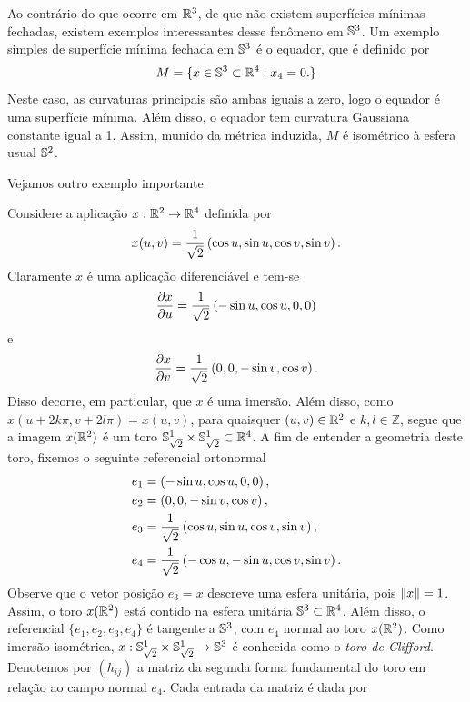 Ao contrário do que ocorre em $\mathbb{R}^3$, de que não existem superfícies mínimas fechadas, existem exemplos interessantes desse fenômeno em $\mathbb{S}^3$. Um exemplo simples de superfície mínima fechada em $\mathbb{S}^3$ é o equador, que é definido por
\[ M = \{ x \in \mathbb{S}^3 \subset \mathbb{R}^4: x_4=0. \} \]
Neste caso, as curvaturas principais são ambas iguais a zero, logo o equador é uma superfície mínima. Além disso, o equador tem curvatura Gaussiana constante igual a 1. Assim, munido da métrica induzida, $M$ é isométrico à esfera usual $\mathbb{S}^2$.

Vejamos outro exemplo importante.

\begin{exemplo}
	Considere a aplicação $x: \mathbb{R}^2 \rightarrow \mathbb{R}^4$ definida por
	\begin{equation}\label{def:toro-de-clifford}
		x(u,v) = \frac{1}{\sqrt{2}} \left( \cos u, \sin u, \cos v, \sin v \right).
	\end{equation}
	Claramente $x$ é uma aplicação diferenciável e tem-se
	\[ \frac{\partial x}{\partial u} = \frac{1}{\sqrt{2}} \left( -\sin u, \cos u, 0, 0 \right) \]
	e
	\[ \frac{\partial x}{\partial v} = \frac{1}{\sqrt{2}} \left( 0,0, -\sin v, \cos v \right). \]
	Disso decorre, em particular, que $x$ é uma imersão. Além disso, como $x(u + 2k \pi, v + 2l \pi) = x(u,v)$, para quaisquer $(u,v) \in \mathbb{R}^2$ e $k,l \in \mathbb{Z}$, segue que a imagem $x(\mathbb{R}^2)$ é um toro $\mathbb{S}_{\sqrt{2}}^1 \times \mathbb{S}_{\sqrt{2}}^1 \subset \mathbb{R}^4$. A fim de entender a geometria deste toro, fixemos o seguinte referencial ortonormal
	\begin{align*}
		e_1 &= \left( -\sin u, \cos u, 0, 0 \right),\\
		e_2 &= \left( 0, 0, -\sin v, \cos v \right),\\
		e_3 &= \frac{1}{\sqrt{2}} \left( \cos u, \sin u, \cos v, \sin v \right),\\
		e_4 &= \frac{1}{\sqrt{2}} \left( -\cos u, -\sin u, \cos v, \sin v \right).
	\end{align*}
	Observe que o vetor posição $e_3 = x$ descreve uma esfera unitária, pois $\left\| x \right\| = 1$. Assim, o toro $x(\mathbb{R}^2)$ está contido na esfera unitária $\mathbb{S}^3 \subset \mathbb{R}^4$. Além disso, o referencial $\{e_1,e_2,e_3,e_4\}$ é tangente a $\mathbb{S}^3$, com
	$e_4$ normal ao toro $x(\mathbb{R}^2)$. Como imersão isométrica, $x: \mathbb{S}_{\sqrt{2}}^1 \times \mathbb{S}_{\sqrt{2}}^1 \rightarrow \mathbb{S}^3$ é conhecida como o \emph{toro de Clifford}. Denotemos por $(h_{ij})$ a matriz da segunda forma fundamental do toro em relação ao campo normal $e_4$. Cada entrada da matriz é dada por

\end{exemplo}

